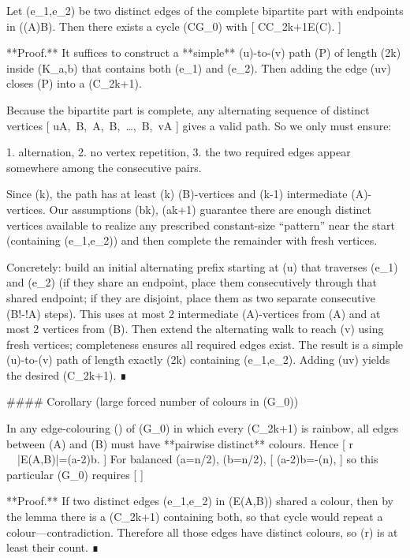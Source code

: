 Let (e_1,e_2) be two distinct edges of the complete bipartite part with endpoints in ((A)\times B). Then there exists a cycle (C\subseteq G_0) with
[
C\cong C_{2k+1}\quad{}\subseteq E(C).
]

**Proof.** It suffices to construct a **simple** (u)-to-(v) path (P) of length (2k) inside (K_{a,b}) that contains both (e_1) and (e_2). Then adding the edge (uv) closes (P) into a (C_{2k+1}).

Because the bipartite part is complete, any alternating sequence of distinct vertices
[
u\in A,\ B,\ A,\ B,\ \dots,\ B,\ v\in A
]
gives a valid path. So we only must ensure:

1. alternation,
2. no vertex repetition,
3. the two required edges appear somewhere among the consecutive pairs.

Since (k), the path has at least (k) (B)-vertices and (k-1) intermediate (A)-vertices. Our assumptions (b\ge k), (a\ge k+1) guarantee there are enough distinct vertices available to realize any prescribed constant-size “pattern” near the start (containing (e_1,e_2)) and then complete the remainder with fresh vertices.

Concretely: build an initial alternating prefix starting at (u) that traverses (e_1) and (e_2) (if they share an endpoint, place them consecutively through that shared endpoint; if they are disjoint, place them as two separate consecutive (B!-!A) steps). This uses at most 2 intermediate (A)-vertices from (A) and at most 2 vertices from (B). Then extend the alternating walk to reach (v) using fresh vertices; completeness ensures all required edges exist. The result is a simple (u)-to-(v) path of length exactly (2k) containing (e_1,e_2). Adding (uv) yields the desired (C_{2k+1}). ∎

#### Corollary (large forced number of colours in (G_0))

In any edge-colouring (\varphi) of (G_0) in which every (C_{2k+1}) is rainbow, all edges between (A) and (B) must have **pairwise distinct** colours. Hence
[
r \ \ge\ |E(A,B)|=(a-2)b.
]
For balanced (a=\lfloor n/2\rfloor), (b=\lceil n/2\rceil),
[
(a-2)b=\left\lfloor{}\right\rfloor-\Theta(n),
]
so this particular (G_0) requires
[
]

**Proof.** If two distinct edges (e_1,e_2) in (E(A,B)) shared a colour, then by the lemma there is a (C_{2k+1}) containing both, so that cycle would repeat a colour—contradiction. Therefore all those edges have distinct colours, so (r) is at least their count. ∎

